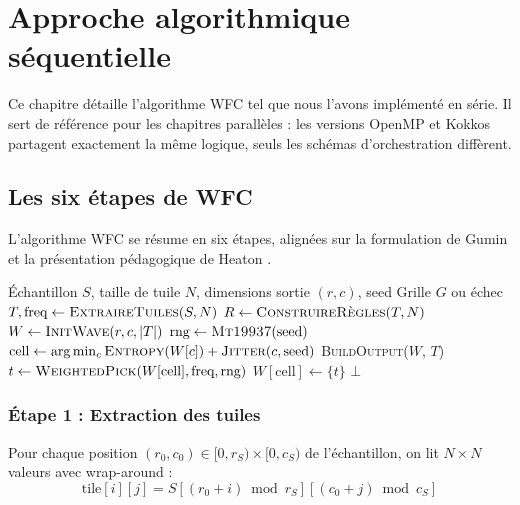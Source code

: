 \chapter{Approche algorithmique séquentielle}
\label{chap:approche}

Ce chapitre détaille l'algorithme WFC tel que nous l'avons implémenté en série. Il sert de référence pour les chapitres parallèles : les versions OpenMP et Kokkos partagent exactement la même logique, seuls les schémas d'orchestration diffèrent.

\section{Les six étapes de WFC}

L'algorithme WFC se résume en six étapes, alignées sur la formulation de Gumin \cite{gumin2016wfc} et la présentation pédagogique de Heaton \cite{heaton2018wfc}.

\begin{algorithm}[H]
\caption{Wave Function Collapse séquentiel}
\begin{algorithmic}[1]
\Require Échantillon $S$, taille de tuile $N$, dimensions sortie $(r, c)$, seed
\Ensure Grille $G$ ou échec
\State $T, \text{freq} \gets \textsc{ExtraireTuiles}(S, N)$
\State $R \gets \textsc{ConstruireRègles}(T, N)$
\State $W \gets \textsc{InitWave}(r, c, |T|)$ 
\State $\text{rng} \gets \textsc{Mt19937}(\text{seed})$
\Loop
    \State $\text{cell} \gets \arg\min_c \textsc{Entropy}(W[c]) + \textsc{Jitter}(c, \text{seed})$
        \State \Return \textsc{BuildOutput}($W$, $T$) 
    \EndIf
    \State $t \gets \textsc{WeightedPick}(W[\text{cell}], \text{freq}, \text{rng})$
    \State $W[\text{cell}] \gets \{t\}$ 
        \State \Return $\bot$ 
    \EndIf
\EndLoop
\end{algorithmic}
\end{algorithm}

\subsection{Étape 1 : Extraction des tuiles}

\begin{definition}
Pour chaque position $(r_0, c_0) \in [0, r_S) \times [0, c_S)$ de l'échantillon, on lit $N \times N$ valeurs avec wrap-around :
\[
\text{tile}[i][j] = S[(r_0 + i) \bmod r_S][(c_0 + j) \bmod c_S]
\]
\end{definition}

